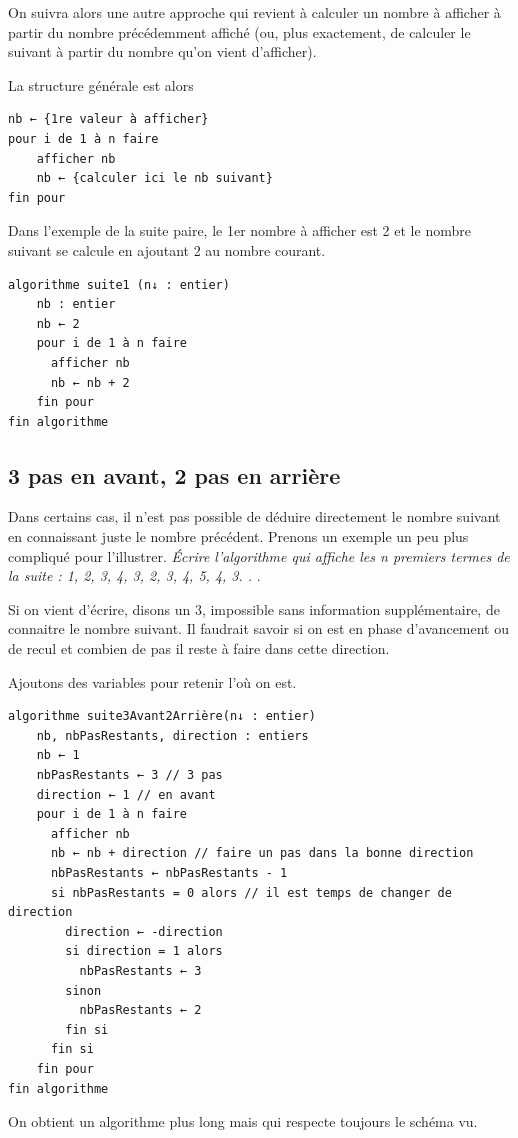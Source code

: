 \documentclass[11pt,a4paper]{article}
\begin{document}
        On suivra alors une autre approche
        qui revient \`a calculer un nombre \`a afficher \`a partir du nombre pr\'ec\'edemment affich\'e (ou, plus
        exactement, de calculer le suivant \`a partir du nombre qu'on vient d'afficher). \par
				
        La structure g\'en\'erale est alors
      
            \par
        \begin{verbatim}
nb ← {1re valeur à afficher}
pour i de 1 à n faire
    afficher nb
    nb ← {calculer ici le nb suivant}
fin pour
      \end{verbatim}
        Dans l'exemple de la suite paire, le 1er nombre \`a afficher est 
        2 et le nombre suivant se calcule en ajoutant 2 au nombre courant.
      
            \par
        \begin{verbatim}
algorithme suite1 (n↓ : entier)
    nb : entier
    nb ← 2
    pour i de 1 à n faire
      afficher nb
      nb ← nb + 2
    fin pour
fin algorithme
      \end{verbatim}\subsection{3 pas en avant, 2 pas en arri\`ere}
		    Dans certains cas, il n'est pas possible de d\'eduire directement le nombre suivant en connaissant juste le nombre pr\'ec\'edent. 
		    Prenons un exemple un peu plus compliqu\'e pour l'illustrer.
		    \guillemotleft  \textit{\'Ecrire l'algorithme qui affiche les n premiers termes de la suite : 1, 2, 3, 4, 3, 2, 3, 4, 5, 4, 3. . }. \guillemotright 
      
            \par
        
        Si on vient d'\'ecrire, disons un 3, impossible sans information suppl\'ementaire, de connaitre
        le nombre suivant. Il faudrait savoir si on est en phase d'avancement ou de recul et combien
        de pas il reste \`a faire dans cette direction.
      
            \par
        
        Ajoutons des variables pour retenir l' o\`u on est.
      
            \par
        \begin{verbatim}
algorithme suite3Avant2Arrière(n↓ : entier)
    nb, nbPasRestants, direction : entiers
    nb ← 1
    nbPasRestants ← 3 // 3 pas
    direction ← 1 // en avant
    pour i de 1 à n faire
      afficher nb
      nb ← nb + direction // faire un pas dans la bonne direction
      nbPasRestants ← nbPasRestants - 1
      si nbPasRestants = 0 alors // il est temps de changer de direction
        direction ← -direction
        si direction = 1 alors
          nbPasRestants ← 3
        sinon
          nbPasRestants ← 2
        fin si
      fin si
    fin pour
fin algorithme
      \end{verbatim}
        On obtient un algorithme plus long mais qui respecte toujours le sch\'ema vu.
      
\end{document}
